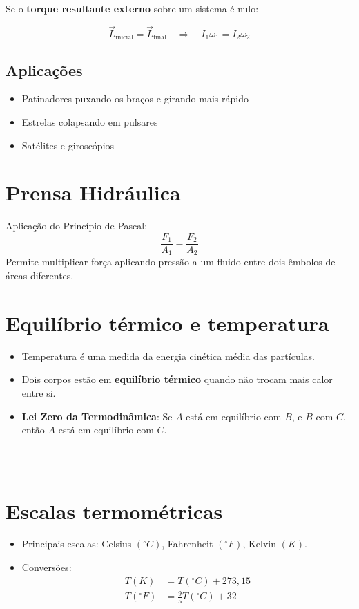 \documentclass[a4paper,12pt]{article}
\begin{document}
\begin{multicols}{2}
Se o \textbf{torque resultante externo} sobre um sistema é nulo:

\[
\vec{L}_{\text{inicial}} = \vec{L}_{\text{final}}
\quad \Rightarrow \quad I_1 \omega_1 = I_2 \omega_2
\]

\subsection{Aplicações}

\begin{itemize}
  \item Patinadores puxando os braços e girando mais rápido
  \item Estrelas colapsando em pulsares
  \item Satélites e giroscópios
\end{itemize}
\section{Prensa Hidráulica}
Aplicação do Princípio de Pascal:
\[
\frac{F_1}{A_1} = \frac{F_2}{A_2}
\]
Permite multiplicar força aplicando pressão a um fluido entre dois êmbolos de áreas diferentes.

\section{Equilíbrio térmico e temperatura}
\begin{itemize}
    \item Temperatura é uma medida da energia cinética média das partículas.
    \item Dois corpos estão em \textbf{equilíbrio térmico} quando não trocam mais calor entre si.
    \item \textbf{Lei Zero da Termodinâmica}: Se $A$ está em equilíbrio com $B$, e $B$ com $C$, então $A$ está em equilíbrio com $C$.
\end{itemize}

\noindent\rule{\linewidth}{1pt}\\

\section{Escalas termométricas}

\begin{itemize}
    \item Principais escalas: Celsius $(^\circ C)$, Fahrenheit $(^\circ F)$, Kelvin $(K)$.
    \item Conversões:
    \begin{align*}
        T(K) &= T(^\circ C) + 273{,}15 \\
        T(^\circ F) &= \frac{9}{5}T(^\circ C) + 32
    \end{align*}
\end{itemize}


\end{multicols}
\end{document}
